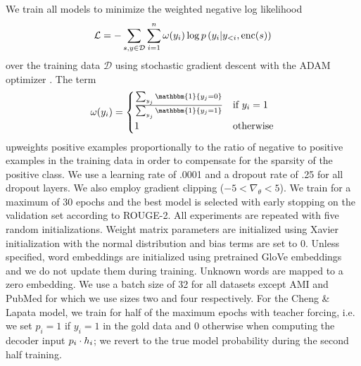 We train all models to minimize the weighted negative log likelihood
\[\mathcal{L} = -\sum_{s,y\in \mathcal{D}} \sum_{i=1}^\docSize \omega(y_i) \log p\left(y_i|y_{<i},
\operatorname{enc}(\sent)\right)\]
over the training data $\mathcal{D}$
using stochastic gradient descent with the ADAM optimizer
\cite{kingma2014adam}. The term 
\[ \omega(y_i)=\begin{cases}
\frac{\sum_{y_j} \mathbbm{1}\{y_j = 0 \}}{ \sum_{y_j} \mathbbm{1}\{y_j = 1 \}  } & \textrm{if $y_i=1$} \\ 1 & \textrm{otherwise}  \end{cases} \] 
        upweights
    positive examples proportionally to the ratio of negative to positive
    examples in the training data in order to compensate for the sparsity
    of the positive class.
    We use a learning rate of .0001 and a dropout rate of .25 for all dropout
    layers. We also employ gradient clipping ($-5 < \nabla_\theta < 5$).
    We train for a maximum of 30 epochs and the best
    model is selected with early stopping on the validation set according
    to ROUGE-2. All experiments are repeated with five random
    initializations. Weight matrix parameters are initialized using 
    Xavier initialization with the normal distribution 
    \cite{glorot2010understanding} and bias terms are set to 0.
    Unless specified, word embeddings are initialized 
    using pretrained GloVe embeddings \cite{pennington2014glove} and we do 
    not update them during training. Unknown words are mapped to a zero 
    embedding.
    We use a batch size of 32 for all datasets except AMI and PubMed for
    which we use sizes two and four respectively. 
    For the Cheng \& Lapata model, we train for half of the maximum epochs 
    with teacher forcing, i.e. we set $p_i = 1$
    if $y_i = 1$ in the gold data and 0 otherwise 
    when computing the decoder input 
    $p_i \cdot \sentEmb[i]$; we revert to the true model probability 
    during the second half training.

